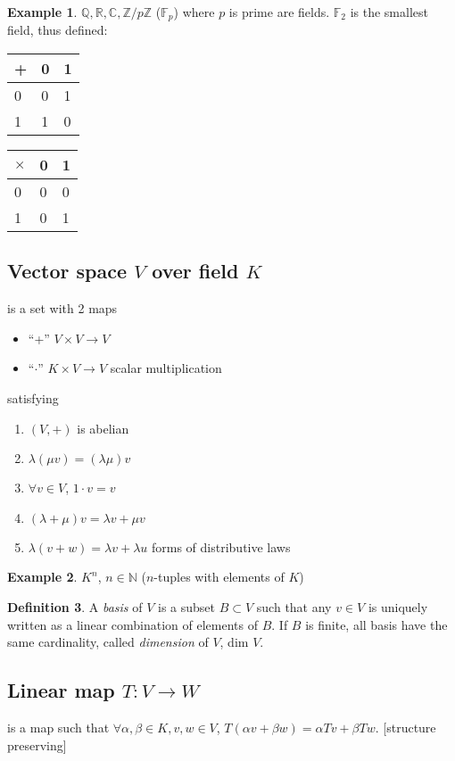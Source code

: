 \documentclass[a4paper]{article}
\theoremstyle{definition}
\newtheorem{defn}{Definition}[subsection]
\newtheorem{example}[defn]{Example}
\begin{document}
\begin{example}
$\mathbb Q, \mathbb R, \mathbb C, \mathbb Z/p \mathbb Z$ ($\mathbb F_p$) where $p$ is prime are fields.
$\mathbb F _2$ is the smallest field, thus defined:

\begin{tabular}{l|ll}
+ & 0 & 1 \\ \hline
0 & 0 & 1 \\
1 & 1 & 0
\end{tabular}
\begin{tabular}{l|ll}
$\times$ & 0 & 1 \\ \hline
0 & 0 & 0 \\
1 & 0 & 1
\end{tabular}
\end{example}

\subsection{Vector space $V$ over field $K$}
is a set with 2 maps
\begin{itemize}
	\item ``+'' $V \times V \rightarrow V$
	\item ``$\cdot$'' $K \times V \rightarrow V$ \qquad scalar multiplication
\end{itemize} satisfying
\begin{enumerate}
	\item $(V,+)$ is abelian
	\item $\lambda (\mu v) = (\lambda \mu) v$
	\item $\forall v \in V$, $1\cdot v=v$
	\item $(\lambda +\mu)v = \lambda v + \mu v$
	\item $\lambda (v+w) = \lambda v + \lambda u$  forms of distributive laws 
\end{enumerate}

\begin{example}
	$K^n$, $n\in \mathbb N$ ($n$-tuples with elements of $K$)
\end{example}

\begin{defn}
	A \textit{basis} of $V$ is a subset $B \subset V$ such that any $v \in V$ is uniquely written as a linear combination of elements of $B$. If $B$ is finite, all basis have the same cardinality, called \textit{dimension} of $V$, dim $V$.
\end{defn}

\subsection{Linear map $T:V\rightarrow W$}
is a map such that $\forall \alpha, \beta \in K, v,w\in V$, $T(\alpha v + \beta w) = \alpha Tv + \beta Tw$. [structure preserving]
\end{document}
